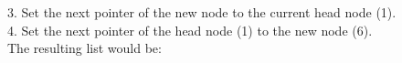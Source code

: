 \documentclass[preview]{standalone}
\begin{document}
3. Set the next pointer of the new node to the current head node (1).\\4. Set the next pointer of the head node (1) to the new node (6).\\The resulting list would be:\\
\end{document}
